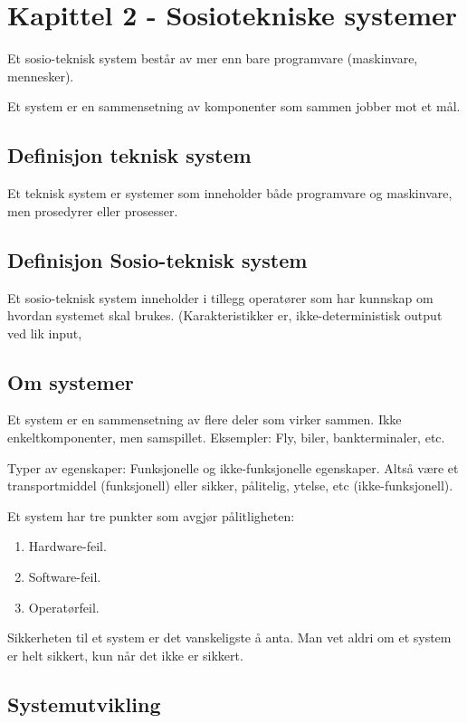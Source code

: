 \documentclass[11pt]{article}
\begin{document}
\section{Kapittel 2 - Sosiotekniske systemer}
\label{sec-2}


  Et sosio-teknisk system består av mer enn bare programvare (maskinvare, mennesker).

  Et system er en sammensetning av komponenter som sammen jobber mot et mål.
\subsection{Definisjon teknisk system}
\label{sec-2.1}

   Et teknisk system er systemer som inneholder både programvare og maskinvare, men prosedyrer eller prosesser. 
\subsection{Definisjon Sosio-teknisk system}
\label{sec-2.2}

   Et sosio-teknisk system inneholder i tillegg operatører som har kunnskap om hvordan systemet skal brukes. 
   (Karakteristikker er, ikke-deterministisk output ved lik input, 
\subsection{Om systemer}
\label{sec-2.3}


   Et system er en sammensetning av flere deler som virker sammen. Ikke enkeltkomponenter, men samspillet.
   Eksempler: Fly, biler, bankterminaler, etc.

   Typer av egenskaper: Funksjonelle og ikke-funksjonelle egenskaper. Altså være et transportmiddel (funksjonell)
   eller sikker, pålitelig, ytelse, etc (ikke-funksjonell).

   Et system har tre punkter som avgjør pålitligheten:
  
\begin{enumerate}
\item Hardware-feil.
\item Software-feil.
\item Operatørfeil.
\end{enumerate}

   Sikkerheten til et system er det vanskeligste å anta. Man vet aldri om et system er helt sikkert, kun når det ikke er sikkert.
\subsection{Systemutvikling}
\label{sec-2.4}
\end{document}
